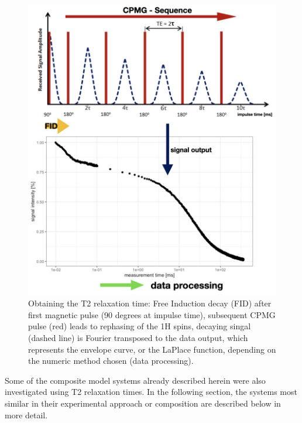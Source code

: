 \documentclass[
]{article}
\begin{document}
\begin{figure}
\includegraphics[width=0.8\linewidth]{images/NMR} \caption[Overview of T2 relaxation measurements: from signal to data.]{Obtaining the T2 relaxation time: Free Induction decay (FID) after first magnetic pulse (90 degrees at impulse time), subsequent CPMG pulse (red) leads to rephasing of the 1H spins, decaying singal (dashed line) is Fourier transposed to the data output, which represents the envelope curve, or the LaPlace function, depending on the numeric method chosen (data processing).}\label{fig:T2intro}
\end{figure}

Some of the composite model systems already described herein were also
investigated using T2 relaxation times. In the following section, the
systems most similar in their experimental approach or composition are
described below in more detail.
\end{document}
